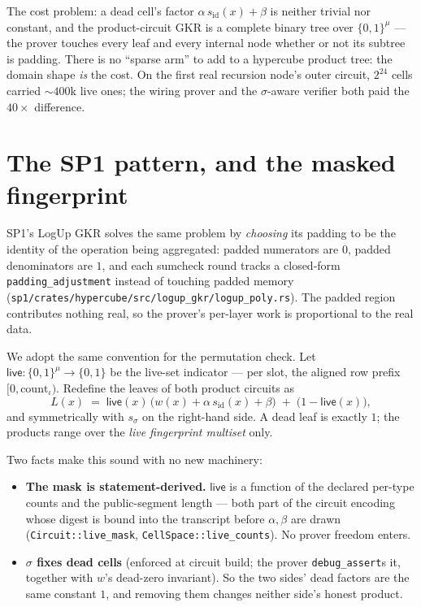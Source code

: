 \documentclass[11pt]{article}
\newcommand{\code}[1]{\texttt{#1}}
\newcommand{\sid}{s_{\mathrm{id}}}
\newcommand{\ssig}{s_{\sigma}}
\newcommand{\live}{\mathsf{live}}
\newcommand{\Bmu}{\{0,1\}^{\mu}}
\theoremstyle{definition}
\begin{document}
The cost problem: a dead cell's factor $\alpha\,\sid(x) + \beta$ is
neither trivial nor constant, and the product-circuit GKR is a complete
binary tree over $\Bmu$ --- the prover touches every leaf and every
internal node whether or not its subtree is padding. There is no
``sparse arm'' to add to a hypercube product tree: the domain shape
\emph{is} the cost. On the first real recursion node's outer circuit,
$2^{24}$ cells carried ${\sim}400$k live ones; the wiring prover and the
$\sigma$-aware verifier both paid the $40\times$ difference.

\section{The SP1 pattern, and the masked fingerprint}

SP1's LogUp GKR solves the same problem by \emph{choosing} its padding to
be the identity of the operation being aggregated: padded numerators are
$0$, padded denominators are $1$, and each sumcheck round tracks a
closed-form \code{padding\_adjustment} instead of touching padded memory
(\code{sp1/crates/hypercube/src/logup\_gkr/logup\_poly.rs}). The padded
region contributes nothing real, so the prover's per-layer work is
proportional to the real data.

We adopt the same convention for the permutation check. Let
$\live : \Bmu \to \{0,1\}$ be the live-set indicator --- per slot, the
aligned row prefix $[0, \mathrm{count}_\iota)$. Redefine the leaves of
both product circuits as
\begin{equation}
\label{eq:masked}
L(x) \;=\; \live(x)\,\bigl(w(x) + \alpha\,\sid(x) + \beta\bigr)
\;+\; \bigl(1 - \live(x)\bigr),
\end{equation}
and symmetrically with $\ssig$ on the right-hand side. A dead leaf is
exactly $1$; the products range over the \emph{live fingerprint multiset}
only.

Two facts make this sound with no new machinery:

\begin{itemize}[leftmargin=2em]
\item \textbf{The mask is statement-derived.} $\live$ is a function of
the declared per-type counts and the public-segment length --- both part
of the circuit encoding whose digest is bound into the transcript before
$\alpha, \beta$ are drawn (\code{Circuit::live\_mask},
\code{CellSpace::live\_counts}). No prover freedom enters.
\item \textbf{$\sigma$ fixes dead cells} (enforced at circuit build; the
prover \code{debug\_assert}s it, together with $w$'s dead-zero
invariant). So the two sides' dead factors are the same constant $1$,
and removing them changes neither side's honest product.
\end{itemize}
\end{document}
